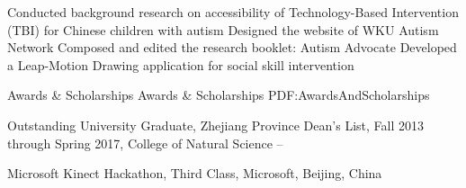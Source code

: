 \documentclass[letterpaper,MMMyyyy,nonstopmode]{simpleresumecv}
\begin{document}
\begin{Body}
\begin{Detail}
\BulletItem
Conducted background research on accessibility of Technology-Based Intervention (TBI) for Chinese children with autism
\BulletItem
Designed the website of WKU Autism Network
\BulletItem
Composed and edited the research booklet: Autism Advocate
\BulletItem
Developed a Leap-Motion Drawing application for social skill intervention
\end{Detail}










\Section
{Awards \&\newline
Scholarships}
{Awards \& Scholarships}
{PDF:AwardsAndScholarships}



\BulletItem
Outstanding University Graduate, Zhejiang Province
\hfill
{}
\BulletItem
Dean's List,
Fall 2013 through Spring 2017,
College of Natural Science
\hfill
{} --

\Gap
\BulletItem
Microsoft Kinect Hackathon,
Third Class, Microsoft, Beijing, China
\hfill
{}
\end{Body}
\end{document}
